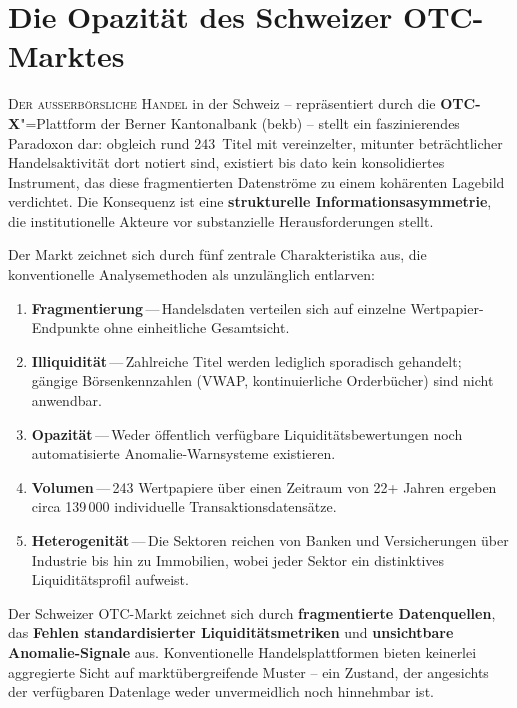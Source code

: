 \documentclass[11pt, a4paper, oneside, openany]{report}
\newcommand{\term}[1]{\textcolor{SwissRed}{\sffamily\textbf{#1}}}
\begin{document}
\section{Die Opazität des Schweizer OTC-Marktes}

\lettrine[lines=3, lraise=0.1, findent=3pt, nindent=0pt]{\textcolor{SwissRed}{D}}{er ausserbörsliche Handel} in der Schweiz -- repräsentiert durch die \term{OTC-X}"=Plattform der Berner Kantonalbank (\gls{bekb}) -- stellt ein faszinierendes Paradoxon dar: obgleich rund 243~Titel mit vereinzelter, mitunter beträchtlicher Handelsaktivität dort notiert sind, existiert bis dato kein konsolidiertes Instrument, das diese fragmentierten Datenströme zu einem kohärenten Lagebild verdichtet. Die Konsequenz ist eine \textbf{strukturelle Informationsasymmetrie}, die institutionelle Akteure vor substanzielle Herausforderungen stellt.

Der Markt zeichnet sich durch fünf zentrale Charakteristika aus, die konventionelle Analysemethoden als unzulänglich entlarven:

\begin{enumerate}[label=\textcolor{SwissRed}{\textbf{\arabic*.}}]
  \item \textbf{Fragmentierung}\,---\,Handelsdaten verteilen sich auf einzelne Wertpapier-Endpunkte ohne einheitliche Gesamtsicht.
  \item \textbf{Illiquidität}\,---\,Zahlreiche Titel werden lediglich sporadisch gehandelt; gängige Börsenkennzahlen (VWAP, kontinuierliche Orderbücher) sind nicht anwendbar.
  \item \textbf{Opazität}\,---\,Weder öffentlich verfügbare Liquiditätsbewertungen noch automatisierte Anomalie-Warnsysteme existieren.
  \item \textbf{Volumen}\,---\,243 Wertpapiere über einen Zeitraum von 22+ Jahren ergeben circa 139\,000 individuelle Transaktionsdatensätze.
  \item \textbf{Heterogenität}\,---\,Die Sektoren reichen von Banken und Versicherungen über Industrie bis hin zu Immobilien, wobei jeder Sektor ein distinktives Liquiditätsprofil aufweist.
\end{enumerate}

\begin{infobox}[Problemstellung]
Der Schweizer OTC-Markt zeichnet sich durch \textbf{fragmentierte Datenquellen}, das \textbf{Fehlen standardisierter Liquiditätsmetriken} und \textbf{unsichtbare Anomalie-Signale} aus. Konventionelle Handelsplattformen bieten keinerlei aggregierte Sicht auf marktübergreifende Muster -- ein Zustand, der angesichts der verfügbaren Datenlage weder unvermeidlich noch hinnehmbar ist.
\end{infobox}
\end{document}
